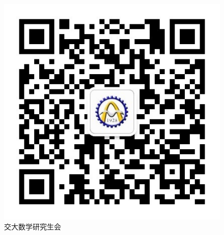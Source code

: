 \documentclass{ctexart}
\begin{document}
\lipsum[1-2]
\begin{figure}[htbp]
\centering
\includegraphics{qrcode.jpeg}
\caption{交大数学研究生会}
\label{qrcode}
\end{figure}
\lipsum[3-4]
\end{document}
